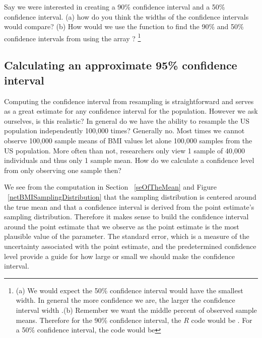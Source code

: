\begin{exercise}
Say we were interested in creating a 90\% confidence interval and a 50\% confidence interval. (a) how do you think the widths of the confidence intervals would compare? (b) How would we use the  function to find the 90\% and 50\% confidence intervals from using the array ?
 \footnote{(a) We would expect the 50\% confidence interval would have the smallest width. In general the more confidence we are, the larger the confidence interval width .(b) Remember we want the middle percent of observed sample means. Therefore for the 90\% confidence interval, the $R$ code would be . For a 50\% confidence interval, the code would be }
\end{exercise}

\subsection{Calculating an approximate 95\% confidence interval}
Computing the confidence interval from resampling is straightforward and serves as a great estimate for any confidence interval for the population. However we ask ourselves, is this realistic? In general do we have the ability to resample the US population independently 100,000 times? Generally no. Most times we cannot observe 100,000 sample means of BMI values let alone 100,000 samples from the US population. More often than not, researchers only view 1 sample of 40,000 individuals and thus only 1 sample mean. How do we calculate a confidence level from only observing one sample then? 

We see from the computation in Section ~\ref{seOfTheMean} and Figure ~\ref{netBMISamplingDistribution} that the sampling distribution is centered around the true mean and that a confidence interval is derived from the point estimate's sampling distribution. Therefore it makes sense to build the confidence interval around the point estimate that we observe as the point estimate is the most plausible value of the parameter. The standard error, which is a measure of the uncertainty associated with the point estimate, and the predetermined confidence level provide a guide for how large or small we should make the confidence interval. 

